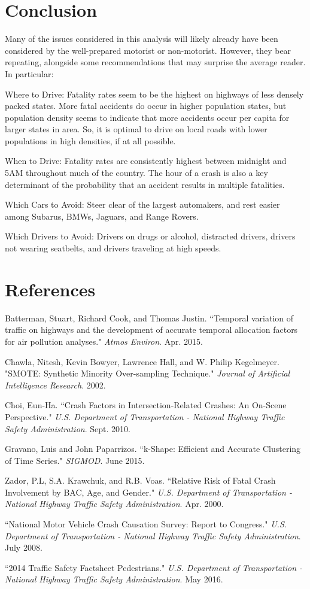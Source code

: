 \documentclass[11pt, oneside,titlepage]{article}   	%
\begin{document}
\section*{Conclusion}

Many of the issues considered in this analysis will likely already have been considered by the well-prepared motorist or non-motorist. However, they bear repeating, alongside some recommendations that may surprise the average reader. In particular:

Where to Drive: Fatality rates seem to be the highest on highways of less densely packed states. More fatal accidents do occur in higher population states, but population density seems to indicate that more accidents occur per capita for larger states in area. So, it is optimal to drive on local roads with lower populations in high densities, if at all possible.

When to Drive: Fatality rates are consistently highest between midnight and 5AM throughout much of the country. The hour of a crash is also a key determinant of the probability that an accident results in multiple fatalities.

Which Cars to Avoid: Steer clear of the largest automakers, and rest easier among Subarus, BMWs, Jaguars, and Range Rovers.

Which Drivers to Avoid: Drivers on drugs or alcohol, distracted drivers, drivers not wearing seatbelts, and drivers traveling at high speeds.


\section*{References}
\begin{hangparas}{1.27cm}{1}
Batterman, Stuart, Richard Cook, and Thomas Justin. ``Temporal variation of traffic on highways and the development of accurate temporal allocation factors for air pollution analyses." \textit{Atmos Environ}. Apr. 2015.

Chawla, Nitesh, Kevin Bowyer, Lawrence Hall, and W. Philip Kegelmeyer. "SMOTE: Synthetic Minority Over-sampling Technique." \textit{Journal of Artificial Intelligence Research}. 2002.

Choi, Eun-Ha. ``Crash Factors in Intersection-Related Crashes: An On-Scene Perspective." \textit{U.S. Department of Transportation - National Highway Traffic Safety Administration}. Sept. 2010.

Gravano, Luis and John Paparrizos. ``k-Shape: Efficient and Accurate Clustering of Time Series." \textit{SIGMOD}. June 2015.

Zador, P.L, S.A. Krawchuk, and R.B. Voas. ``Relative Risk of Fatal Crash Involvement by BAC, Age, and Gender." \textit{U.S. Department of Transportation - National Highway Traffic Safety Administration}. Apr. 2000.

``National Motor Vehicle Crash Causation Survey: Report to Congress." \textit{U.S. Department of Transportation - National Highway Traffic Safety Administration}. July 2008.

``2014 Traffic Safety Factsheet Pedestrians." \textit{U.S. Department of Transportation - National Highway Traffic Safety Administration}. May 2016.

\end{hangparas}
\end{document}
